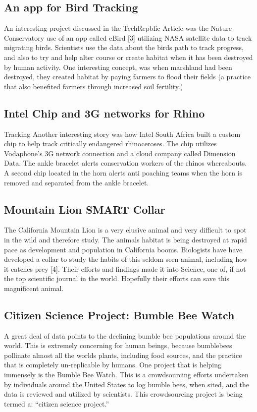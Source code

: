 \documentclass[sigconf]{acmart}
\begin{document}
\subsection{    An app for Bird Tracking}
An interesting project discussed in the TechRepblic Article was the Nature Conservatory use of an app called eBird [3] utilizing NASA satellite data to track migrating birds.  Scientists use the data about the birds path to track progress, and also to try and help alter course or create habitat when it has been destroyed by human activity.  One interesting concept, was when marshland had been destroyed, they created habitat by paying farmers to flood their fields (a practice that also benefited farmers through increased soil fertility.) 
\subsection{    Intel Chip and 3G networks for Rhino} Tracking
Another interesting story was how Intel South Africa built a custom chip to help track critically endangered rhinoceroses.  The chip utilizes Vodaphone’s 3G network connection and a cloud company called Dimension Data. The ankle bracelet alerts conservation workers of the rhinos whereabouts. A second chip located in the horn alerts anti poaching teams when the horn is removed and separated from the ankle bracelet.  
\subsection{    Mountain Lion SMART Collar}
The California Mountain Lion is a very elusive animal and very difficult to spot in the wild and therefore study.  The animals habitat is being destroyed at rapid pace as development and population in California booms.  Biologists have have developed a collar to study the habits of this seldom seen animal, including how it catches prey [4].  Their efforts and findings made it into Science, one of, if not the top scientific journal in the world.  Hopefully their efforts can save this magnificent animal. 
\subsection{    Citizen Science Project: Bumble Bee Watch}
A great deal of data points to the declining bumble bee populations around the world.  This is extremely concerning for human beings, because bumblebees pollinate almost all the worlds plants, including food sources, and the practice that is completely un-replicable by humans.  One project that is helping immensely is the Bumble Bee Watch.  This is a crowdsourcing efforts undertaken by individuals around the United States to log bumble bees, when sited, and the data is reviewed and utilized by scientists.  This crowdsourcing project is being termed a: “citizen science project.”       
\end{document}
